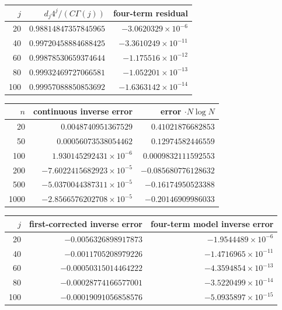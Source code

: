 \begin{tabular}{r r r}
$j$ & $d_j4^j/(C\Gamma(j))$ & four-term residual \\
\hline
20 & $0.98814847357845965$ & $-3.0620329\times 10^{-6}$ \\
40 & $0.99720458884688425$ & $-3.3610249\times 10^{-11}$ \\
60 & $0.99878530659374644$ & $-1.175516\times 10^{-12}$ \\
80 & $0.99932469727066581$ & $-1.052201\times 10^{-13}$ \\
100 & $0.99957088850853692$ & $-1.6363142\times 10^{-14}$ \\
\end{tabular}

\begin{tabular}{r r r}
$n$ & continuous inverse error & error $\cdot N\log N$ \\
\hline
20 & $0.0048740951367529$ & $0.41021876682853$ \\
50 & $0.00056073538054462$ & $0.12974582446559$ \\
100 & $1.930145292431\times 10^{-6}$ & $0.0009832111592553$ \\
200 & $-7.6022415682923\times 10^{-5}$ & $-0.085680776128632$ \\
500 & $-5.0370044387311\times 10^{-5}$ & $-0.16174950523388$ \\
1000 & $-2.8566576202708\times 10^{-5}$ & $-0.20146909986033$ \\
\end{tabular}

\begin{tabular}{r r r}
$j$ & first-corrected inverse error & four-term model inverse error \\
\hline
20 & $-0.0056326898917873$ & $-1.9544489\times 10^{-6}$ \\
40 & $-0.0011705208979226$ & $-1.4716965\times 10^{-11}$ \\
60 & $-0.00050315014464222$ & $-4.3594854\times 10^{-13}$ \\
80 & $-0.00028774166577001$ & $-3.5220499\times 10^{-14}$ \\
100 & $-0.00019091056858576$ & $-5.0935897\times 10^{-15}$ \\
\end{tabular}
